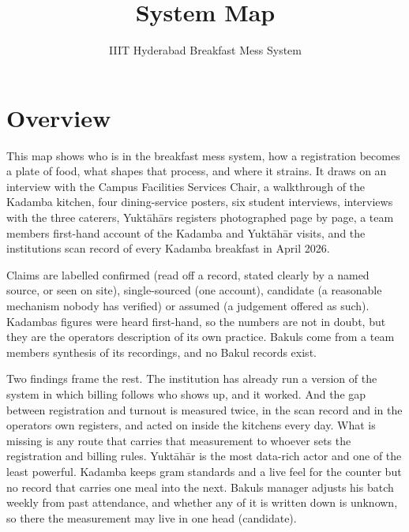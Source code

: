 \documentclass[
  10pt,
  table]{article}
\title{System Map}
\subtitle{IIIT Hyderabad Breakfast Mess System}
\author{}
\date{}
\makeatletter
\gdef\psubtitle{}
\renewcommand{\maketitle}{%
  \begingroup\raggedright
  {\color{pblue}\fontsize{24}{27}\selectfont\bfseries \@title\par}
  \vspace{3pt}{\color{pblue}\rule{\linewidth}{2.4pt}}\par\vspace{5pt}
  {\color{pslate}\large \psubtitle\par}
  \vspace{4pt}
  \endgroup}
\makeatother
\begin{document}
\maketitle

\renewcommand*\contentsname{Contents}
{
\hypersetup{linkcolor=pslate}
\setcounter{tocdepth}{2}
\tableofcontents
}
\section{Overview}\label{overview}

This map shows who is in the breakfast mess system, how a registration becomes a plate of food, what shapes that process, and where it strains. It draws on an interview with the Campus Facilities Services Chair, a walkthrough of the Kadamba kitchen, four dining-service posters, six student interviews, interviews with the three caterers, Yuktāhār\textquotesingle s registers photographed page by page, a team member\textquotesingle s first-hand account of the Kadamba and Yuktāhār visits, and the institution\textquotesingle s scan record of every Kadamba breakfast in April 2026.

Claims are labelled confirmed (read off a record, stated clearly by a named source, or seen on site), single-sourced (one account), candidate (a reasonable mechanism nobody has verified) or assumed (a judgement offered as such). Kadamba\textquotesingle s figures were heard first-hand, so the numbers are not in doubt, but they are the operator\textquotesingle s description of its own practice. Bakul\textquotesingle s come from a team member\textquotesingle s synthesis of its recordings, and no Bakul records exist.

Two findings frame the rest. The institution has already run a version of the system in which billing follows who shows up, and it worked. And the gap between registration and turnout is measured twice, in the scan record and in the operators\textquotesingle{} own registers, and acted on inside the kitchens every day. What is missing is any route that carries that measurement to whoever sets the registration and billing rules. Yuktāhār is the most data-rich actor and one of the least powerful. Kadamba keeps gram standards and a live feel for the counter but no record that carries one meal into the next. Bakul\textquotesingle s manager adjusts his batch weekly from past attendance, and whether any of it is written down is unknown, so there the measurement may live in one head (candidate).
\end{document}
